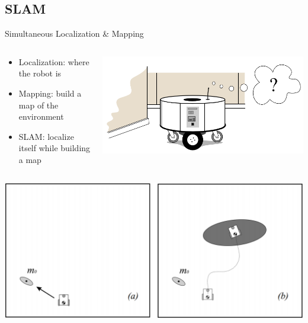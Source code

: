 \documentclass[serif]{beamer}
\begin{document}
    \subsection{SLAM}
    \begin{frame}{Simultaneous Localization \& Mapping}
        \begin{columns}[c]
            \begin{column}{.5\textwidth}
                \begin{itemize}
                    \item{Localization: where the robot is}
                    \item{Mapping: build a map of the environment}
                    \item{SLAM: localize itself while building a map}
                \end{itemize}
            \end{column}
            \begin{column}{.5\textwidth}
                \includegraphics[width=\linewidth]{Images/fig27-where-am-i.png}
            \end{column}
        \end{columns}
    \end{frame}
    \begin{frame}
        \centering
        \includegraphics[width=\linewidth]{Images/fig26-slam-a-b.png}
    \end{frame}
\end{document}
